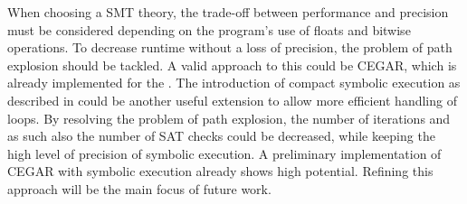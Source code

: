 When choosing a SMT theory,
the trade-off between performance and precision
must be considered depending on the program's use of floats and bitwise operations.
To decrease runtime without a loss of precision, the problem of path explosion should be tackled.
A valid approach to this could be CEGAR, which is already implemented for the .
The introduction of compact symbolic execution as described in \cite{Slaby2013} could be another useful extension to allow more efficient handling of loops.
By resolving the problem of path explosion, the number of iterations and as such also the number of SAT checks could be decreased, while keeping the high level of precision of symbolic execution.
A preliminary implementation of CEGAR with symbolic execution already shows high potential.
Refining this approach will be the main focus of future work.
